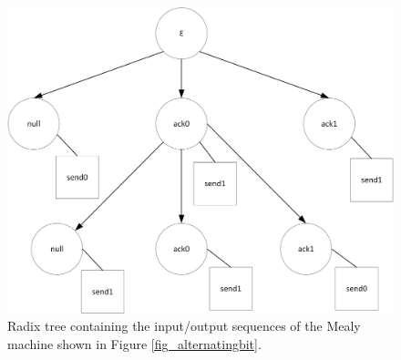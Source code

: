 \begin{figure}[!ht] 
	\centering
	\includegraphics[width=120mm, keepaspectratio]{figures/impl_radix_example.png}
	\caption{Radix tree containing the input/output sequences of the Mealy machine shown in Figure \ref{fig_alternatingbit}.} 
	\label{fig_impl_radix_example}
\end{figure}